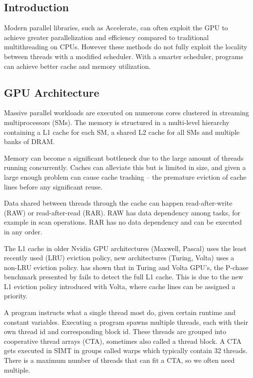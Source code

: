 \documentclass{article}
\begin{document}
\begin{multicols}{2}

\section{Introduction}
Modern parallel libraries, such as Accelerate, can often exploit the GPU to achieve greater parallelization and efficiency compared to traditional multithreading on CPUs.
\cite{chakravarty2011accelerating}
However these methods do not fully exploit the locality between threads with a modified scheduler.
With a smarter scheduler, programs can achieve better cache and memory utilization.
\cite{nugteren2014study}

\subsection{GPU Architecture}
Massive parallel workloads are executed on numerous cores clustered in streaming multiprocessors (SMs).
The memory is structured in a multi-level hierarchy containing a L1 cache for each SM, a shared L2 cache for all SMs and multiple banks of DRAM.
\cite{nvidia2017volta,nvidia2020ampere}

Memory can become a significant bottleneck due to the large amount of threads running concurrently.
Caches can alleviate this but is limited in size, and given a large enough problem can cause cache trashing -- the premature eviction of cache lines before any significant reuse.
\cite{dai2016model}

Data shared between threads through the cache can happen read-after-write (RAW) or read-after-read (RAR).
RAW has data dependency among tasks, for example in scan operations.
RAR has no data dependency and can be executed in any order.
\cite{tripathy2021paver}

The L1 cache in older Nvidia GPU architectures (Maxwell, Pascal) uses the least recently used (LRU) eviction policy, new architectures (Turing, Volta) uses a non-LRU eviction policy. 
\cite{jia2019dissecting, jia2018dissecting,mei2016dissecting}
\citet{jia2019dissecting} has shown that in Turing and Volta GPU's, the P-chase benchmark presented by \citet{mei2016dissecting} fails to detect the full L1 cache.
This is due to the new L1 eviction policy introduced with Volta, where cache lines can be assigned a priority.
\cite{jia2019dissecting,nvidia2021cudadocs}

A program instructs what a single thread most do, given certain runtime and constant variables.
Executing a program spawns multiple threads, each with their own thread id and corresponding block id.
These threads are grouped into cooperative thread arrays (CTA), sometimes also called a thread block.
A CTA gets executed in SIMT in groups called warps which typically contain 32 threads.
There is a maximum number of threads that can fit a CTA, so we often need multiple.


\end{multicols}
\end{document}
